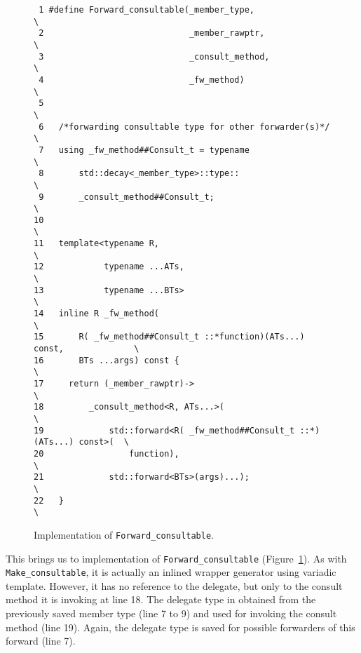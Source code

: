 \documentclass{article}
\begin{document}
\begin{figure}[ht]
{\small
\begin{lstlisting}
 1 #define Forward_consultable(_member_type,                               \
 2                             _member_rawptr,                             \
 3                             _consult_method,                            \
 4                             _fw_method)                                 \
 5                                                                         \
 6   /*forwarding consultable type for other forwarder(s)*/                \
 7   using _fw_method##Consult_t = typename                                \
 8       std::decay<_member_type>::type::                                  \
 9       _consult_method##Consult_t;                                       \
10                                                                         \
11   template<typename R,                                                  \
12            typename ...ATs,                                             \
13            typename ...BTs>                                             \
14   inline R _fw_method(                                                  \
15       R( _fw_method##Consult_t ::*function)(ATs...) const,              \
16       BTs ...args) const {                                              \
17     return (_member_rawptr)->                                           \
18         _consult_method<R, ATs...>(                                     \
19             std::forward<R( _fw_method##Consult_t ::*)(ATs...) const>(  \
20                 function),                                              \
21             std::forward<BTs>(args)...);                                \
22   }                                                                     \
\end{lstlisting}}
\cprotect\caption{Implementation of \verb+Forward_consultable+.}
\label{impl:forward}
\end{figure}

This brings us to implementation of \verb+Forward_consultable+ (Figure~\ref{impl:forward}). As with \verb+Make_consultable+, it is actually an inlined wrapper generator using variadic template. However, it has no reference to the delegate, but only to the consult method it is invoking at line 18. The delegate type in obtained from the previously saved member type (line 7 to 9) and used for invoking the consult method (line 19). Again, the delegate type is saved for possible forwarders of this forward (line 7).   
\end{document}
